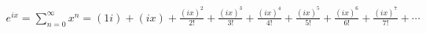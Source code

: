 \documentclass[preview]{standalone}
\begin{document}
\begin{align*}
{e^{ix} =\sum_{n=0}^{\infty} x^n = (1i)+(ix)+\frac{(ix)^2}{2!}+\frac{(ix)^3}{3!}+\frac{(ix)^4}{4!}+\frac{(ix)^5}{5!}+\frac{(ix)^6}{6!}+\frac{(ix)^7}{7!}+\cdots}
\end{align*}
\end{document}
